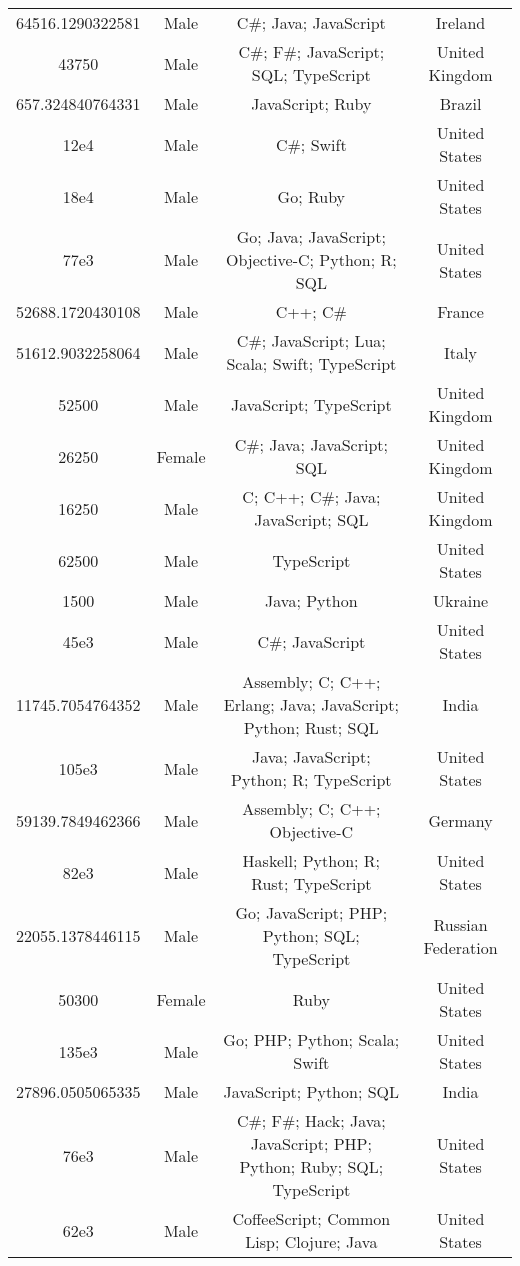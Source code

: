\begin{center}
\begin{tabular}{ |c|c|c|c| }
64516.1290322581  &  Male  &  C\#; Java; JavaScript  &  Ireland  \\ 
43750  &  Male  &  C\#; F\#; JavaScript; SQL; TypeScript  &  United Kingdom  \\ 
657.324840764331  &  Male  &  JavaScript; Ruby  &  Brazil  \\ 
12e4  &  Male  &  C\#; Swift  &  United States  \\ 
18e4  &  Male  &  Go; Ruby  &  United States  \\ 
77e3  &  Male  &  Go; Java; JavaScript; Objective-C; Python; R; SQL  &  United States  \\ 
52688.1720430108  &  Male  &  C++; C\#  &  France  \\ 
51612.9032258064  &  Male  &  C\#; JavaScript; Lua; Scala; Swift; TypeScript  &  Italy  \\ 
52500  &  Male  &  JavaScript; TypeScript  &  United Kingdom  \\ 
26250  &  Female  &  C\#; Java; JavaScript; SQL  &  United Kingdom  \\ 
16250  &  Male  &  C; C++; C\#; Java; JavaScript; SQL  &  United Kingdom  \\ 
62500  &  Male  &  TypeScript  &  United States  \\ 
1500  &  Male  &  Java; Python  &  Ukraine  \\ 
45e3  &  Male  &  C\#; JavaScript  &  United States  \\ 
11745.7054764352  &  Male  &  Assembly; C; C++; Erlang; Java; JavaScript; Python; Rust; SQL  &  India  \\ 
105e3  &  Male  &  Java; JavaScript; Python; R; TypeScript  &  United States  \\ 
59139.7849462366  &  Male  &  Assembly; C; C++; Objective-C  &  Germany  \\ 
82e3  &  Male  &  Haskell; Python; R; Rust; TypeScript  &  United States  \\ 
22055.1378446115  &  Male  &  Go; JavaScript; PHP; Python; SQL; TypeScript  &  Russian Federation  \\ 
50300  &  Female  &  Ruby  &  United States  \\ 
135e3  &  Male  &  Go; PHP; Python; Scala; Swift  &  United States  \\ 
27896.0505065335  &  Male  &  JavaScript; Python; SQL  &  India  \\ 
76e3  &  Male  &  C\#; F\#; Hack; Java; JavaScript; PHP; Python; Ruby; SQL; TypeScript  &  United States  \\ 
62e3  &  Male  &  CoffeeScript; Common Lisp; Clojure; Java  &  United States  \\ 

\end{tabular}
\end{center}
